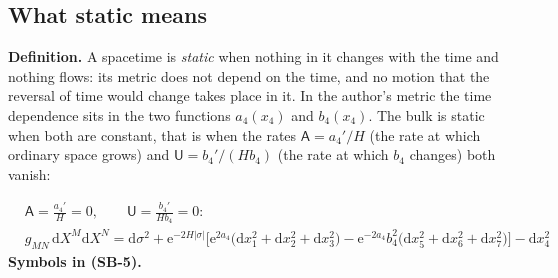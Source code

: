 \documentclass[
  10pt,
]{article}
\begin{document}
\hypertarget{what-static-means}{%
\subsection{What static means}\label{what-static-means}}

\textbf{Definition.} A spacetime is \emph{static} when nothing in it
changes with the time and nothing flows: its metric does not depend on
the time, and no motion that the reversal of time would change takes
place in it. In the author's metric the time dependence sits in the two
functions \(a_4(x_4)\) and \(b_4(x_4)\). The bulk is static when both
are constant, that is when the rates \(\mathsf{A} = a_4'/H\) (the rate
at which ordinary space grows) and \(\mathsf{U} = b_4'/(Hb_4)\) (the
rate at which \(b_4\) changes) both vanish:

\[
\begin{aligned}
&\mathsf{A} = \frac{a_4'}{H} = 0,\qquad \mathsf{U} = \frac{b_4'}{Hb_4} = 0:\\
&g_{MN}\,\mathrm{d}X^M\mathrm{d}X^N = \mathrm{d}\sigma^2 + \mathrm{e}^{-2H\lvert\sigma\rvert}\Big[\mathrm{e}^{2a_4}\big(\mathrm{d}x_1^2
 + \mathrm{d}x_2^2 + \mathrm{d}x_3^2\big) - \mathrm{e}^{-2a_4}b_4^2\big(\mathrm{d}x_5^2 + \mathrm{d}x_6^2 + \mathrm{d}x_7^2\big)\Big]
 - \mathrm{d}x_4^2
\end{aligned} \tag{SB-5}
\] \textbf{Symbols in (SB-5).}
\end{document}

